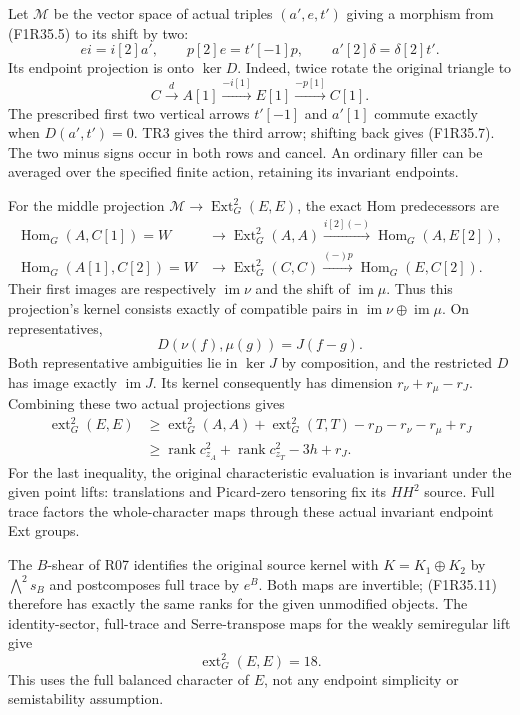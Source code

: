 Let $\mathcal M$ be the vector space of actual triples
$(a',e,t')$ giving a morphism from (F1R35.5) to its
shift by two:
\[
 ei=i[2]a',\qquad p[2]e=t'[-1]p,\qquad
                        a'[2]\delta=\delta[2]t'.
 \tag{F1R35.7}
\]
Its endpoint projection is onto $\ker D$. Indeed,
twice rotate the original triangle to
\[
 C\xrightarrow{d}A[1]\xrightarrow{-i[1]}E[1]
                                      \xrightarrow{-p[1]}C[1].
 \tag{F1R35.8}
\]
The prescribed first two vertical arrows $t'[-1]$ and
$a'[1]$ commute exactly when $D(a',t')=0$.
TR3 gives the third arrow; shifting back gives (F1R35.7).
The two minus signs occur in both rows and cancel.
An ordinary filler can be averaged over the specified
finite action, retaining its invariant endpoints.

For the middle projection $\mathcal M\to\operatorname{Ext}^2_G(E,E)$,
the exact Hom predecessors are
\[
 \begin{split}
 \operatorname{Hom}_G(A,C[1])=W
       &\longrightarrow\operatorname{Ext}^2_G(A,A)
         \xrightarrow{i[2](-)}\operatorname{Hom}_G(A,E[2]),\\
 \operatorname{Hom}_G(A[1],C[2])=W
       &\longrightarrow\operatorname{Ext}^2_G(C,C)
         \xrightarrow{(-)p}\operatorname{Hom}_G(E,C[2]).
 \end{split}
 \tag{F1R35.9}
\]
Their first images are respectively $\operatorname{im}\nu$
and the shift of $\operatorname{im}\mu$. Thus this projection's
kernel consists exactly of compatible pairs in
$\operatorname{im}\nu\oplus\operatorname{im}\mu$.
On representatives,
\[
                       D(\nu(f),\mu(g))=J(f-g).
 \tag{F1R35.10}
\]
Both representative ambiguities lie in $\ker J$ by
composition, and the restricted $D$ has image exactly
$\operatorname{im}J$. Its kernel consequently has dimension
$r_\nu+r_\mu-r_J$. Combining these two actual projections gives
\[
 \begin{split}
 \operatorname{ext}^2_G(E,E)
 &\ge \operatorname{ext}^2_G(A,A)+\operatorname{ext}^2_G(T,T)
                     -r_D-r_\nu-r_\mu+r_J\\
 &\ge \operatorname{rank}c^2_{z_A}
                  +\operatorname{rank}c^2_{z_T}-3h+r_J.
 \end{split}
 \tag{F1R35.11}
\]
For the last inequality, the original characteristic
evaluation is invariant under the given point lifts:
translations and Picard-zero tensoring fix its $HH^2$
source. Full trace factors the whole-character maps
through these actual invariant endpoint Ext groups.

The $B$-shear of R07 identifies the original source
kernel with $K=K_1\oplus K_2$ by $\bigwedge^2s_B$
and postcomposes full trace by $e^B$. Both maps are
invertible; (F1R35.11) therefore has exactly the same
ranks for the given unmodified objects.
The identity-sector, full-trace and Serre-transpose
maps for the weakly semiregular lift give
\[
                            \operatorname{ext}^2_G(E,E)=18.
 \tag{F1R35.12}
\]
This uses the full balanced character of $E$, not
any endpoint simplicity or semistability assumption.


